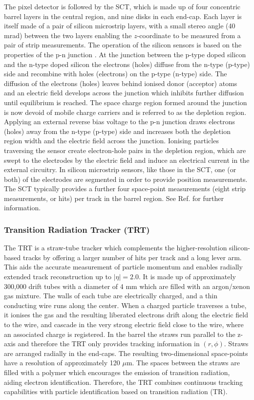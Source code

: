 The pixel detector is followed by the SCT, which is made up of four concentric barrel layers in the central region, and nine disks in each end-cap. Each layer is itself made of a pair of silicon microstrip layers, with a small stereo angle (40 mrad) between the two layers enabling the $z$-coordinate to be measured from a pair of strip measurements. The operation of the silicon sensors is based on the properties of the p-n junction \cite{6773080}. At the junction between the p-type doped silicon and the n-type doped silicon the electrons (holes) diffuse from the n-type (p-type) side and recombine with holes (electrons) on the p-type (n-type) side. The diffusion of the electrons (holes) leaves behind ionised donor (acceptor) atoms and an electric field develops across the junction which inhibits further diffusion until equilibrium is reached. The space charge region formed around the junction is now devoid of mobile charge carriers and is referred to as the depletion region. Applying an external reverse bias voltage to the p-n junction draws electrons (holes) away from the n-type (p-type) side and increases both the depletion region width and the electric field across the junction. Ionising particles traversing the sensor create electron-hole pairs in the depletion region, which are swept to the electrodes by the electric field and induce an electrical current in the external circuitry. In silicon microstrip sensors, like those in the SCT, one (or both) of the electrodes are segmented in order to provide position measurements. The SCT typically provides a further four space-point measurements (eight strip measurements, or hits) per track in the barrel region. See Ref. \cite{inner-detector-TDR} for further information.


\subsubsection{Transition Radiation Tracker (TRT)}

The TRT is a straw-tube tracker which complements the higher-resolution silicon- based tracks by offering a larger number of hits per track and a long lever arm. This aids the accurate measurement of particle momentum and enables radially extended track reconstruction up to $ \lvert \eta \rvert = 2.0$. It is made up of approximately 300,000 drift tubes with a diameter of 4 mm which are filled with an argon/xenon gas mixture. The walls of each tube are electrically charged, and a thin conducting wire runs along the center. When a charged particle traverses a tube, it ionises the gas and the resulting liberated electrons drift along the electric field to the wire, and cascade in the very strong electric field close to the wire, where an associated charge is registered. In the barrel the straws run parallel to the z-axis and therefore the TRT only provides tracking information in $(r, \phi)$. Straws are arranged radially in the end-caps. The resulting two-dimensional space-points have a resolution of approximately 120 $\mu$m. The spaces between the straws are filled with a polymer which encourages the emission of transition radiation, aiding electron identification. Therefore, the TRT combines continuous tracking capabilities with particle identification based on transition radiation (TR).

